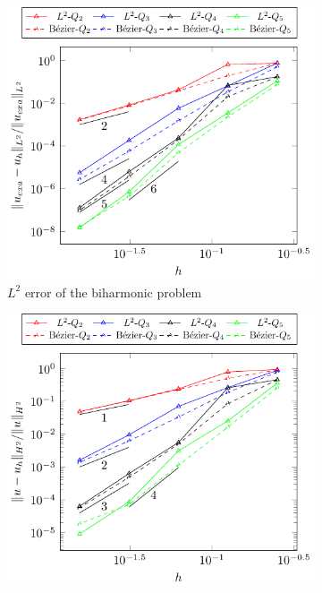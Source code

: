 \documentclass[preprint,12pt]{elsarticle}
\theoremstyle{remark}
\begin{document}
\begin{figure}
    \captionsetup[subfigure]{labelformat=empty, font = footnotesize, justification=centering}
    \centering
    \begin{subfigure}{0.48\textwidth}
      \centering
      \includegraphics[width=\linewidth]{five_patch_biharmonic_basic}
      \caption{$L^2$ error of the biharmonic problem}
    \end{subfigure}%
    \begin{subfigure}{0.48\textwidth}
      \centering
      \includegraphics[width=\linewidth]{five_patch_biharmonic_basic_H2}

\end{subfigure}
\end{figure}
\end{document}
